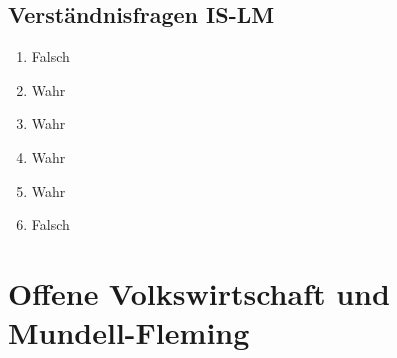 \documentclass{scrartcl}
\begin{document}
\subsection{Verst\"{a}ndnisfragen IS-LM}
\begin{enumerate}
  \item Falsch
  \item Wahr
  \item Wahr
  \item Wahr
  \item Wahr
  \item Falsch
\end{enumerate}

\section{Offene Volkswirtschaft und Mundell-Fleming}
\end{document}
